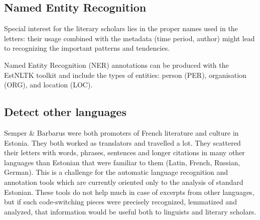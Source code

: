 \documentclass[runningheads]{llncs}
\begin{document}
\subsection{Named Entity Recognition}

Special interest for the literary scholars lies in the proper names used in the letters: their usage combined with the metadata (time period, author) might lead to recognizing the important patterns and tendencies. 

Named Entity Recognition (NER) annotations can be produced with the EstNLTK toolkit and include the types of entities: person (PER), organisation (ORG), and location (LOC). %

\subsection{Detect other languages}

Semper \& Barbarus were both promoters of French literature and culture in Estonia. They both worked as translators and travelled a lot. They scattered their letters with words, phrases, sentences and longer citations in many other languages than Estonian that were familiar to them (Latin, French, Russian, German). This is a challenge for the automatic language recognition and annotation tools which are currently oriented only to the analysis of standard Estonian. These tools do not help much in case of excerpts from other languages, but if such code-switching pieces were precisely recognized, lemmatized and analyzed, that information would be useful both to linguists and literary scholars.
\end{document}
